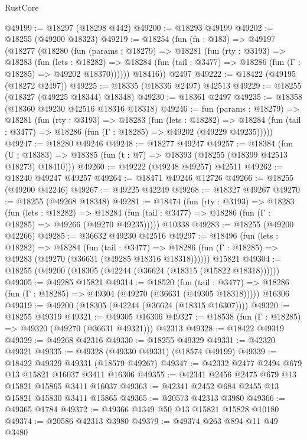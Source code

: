 \begin{lexlean}{RustCore}
\begin{coremodule}
@49199 := @18297 (@18298 @442)
@49200 := @18293 @49199
@49202 := @18255 (@49200 @18323)
@49219 := @18254
    (fun (fn : @183) =>
    @49197
      (@18277
        (@18280
          (fun (params : @18279) =>
          @18281
            (fun (rty : @3193) =>
            @18283
              (fun (lets : @18282) =>
              @18284 (fun (tail : @3477) => @18286 (fun (Γ : @18285) => @49202 @18370))))))
        @18416))
    @2497
@49222 := @18422 (@49195 (@18272 @2497))
@49225 := @18335 (@18336 @2497) @42513
@49229 := @18255 (@18327 (@49225 @18344) @18348)
@49230 := @18361 @2497
@49235 := @18358 (@18360 @49230 @42516 @18316 @18318)
@49246 := fun (params : @18279) =>
  @18281
    (fun (rty : @3193) =>
    @18283
      (fun (lets : @18282) =>
      @18284 (fun (tail : @3477) => @18286 (fun (Γ : @18285) => @49202 (@49229 @49235)))))
@49247 := @18280 @49246
@49248 := @18277 @49247
@49257 := @18384
    (fun (U : @18383) => @18385 (fun (t : @7) => @18393 (@18255 (@18399 @42513 @18273) @18410)))
@49260 := @49222 (@49248 @49257) @42511
@49262 := @18240 @49247 @49257
@49264 := @18471 @49246 @12726
@49266 := @18255 (@49200 @42246)
@49267 := @49225 @42249
@49268 := @18327 @49267
@49270 := @18255 (@49268 @18348)
@49281 := @18474
    (fun (rty : @3193) =>
    @18283
      (fun (lets : @18282) =>
      @18284 (fun (tail : @3477) => @18286 (fun (Γ : @18285) => @49266 (@49270 @49235)))))
    @10338
@49283 := @18255 (@49200 @42266)
@49285 := @36632 @49230 @42516
@49297 := @18496
    (fun (lets : @18282) =>
    @18284
      (fun (tail : @3477) =>
      @18286 (fun (Γ : @18285) => @49283 (@49270 (@36631 (@49285 @18316 @18318))))))
    @15821
@49304 := @18255 (@49200 (@18305 (@42244 (@36624 (@18315 (@15822 @18318))))))
@49305 := @49285 @15821
@49314 := @18520
    (fun (tail : @3477) => @18286 (fun (Γ : @18285) => @49304 (@49270 (@36631 (@49305 @18318)))))
    @16306
@49319 := @49200 (@18305 (@42244 (@36624 (@18315 @16307))))
@49320 := @18255 @49319
@49321 := @49305 @16306
@49327 := @18538 (fun (Γ : @18285) => @49320 (@49270 (@36631 @49321))) @42313
@49328 := @18422 @49319
@49329 := @49268 @42316
@49330 := @18255 @49329
@49331 := @42320 @49321
@49335 := @49328 (@49330 @49331) (@18574 @49199)
@49339 := @18422 @49329 @49331 (@18579 @49267)
@49347 := @42332 @2477 @2494 @679 @13 @15821 @16037 @3411 @16306
@49355 := @42341 @2456 @2475 @679 @13 @15821 @15865 @3411 @16037
@49363 := @42341 @2452 @684 @2455 @13 @15821 @15830 @3411 @15865
@49365 := @20573 @42313 @3980
@49366 := @49365 @1784
@49372 := @49366 @1349 @50 @13 @15821 @15828 @10180
@49374 := @20586 @42313 @3980
@49379 := @49374 @263 @894 @11 @49 @3480

\end{coremodule}
\end{lexlean}
